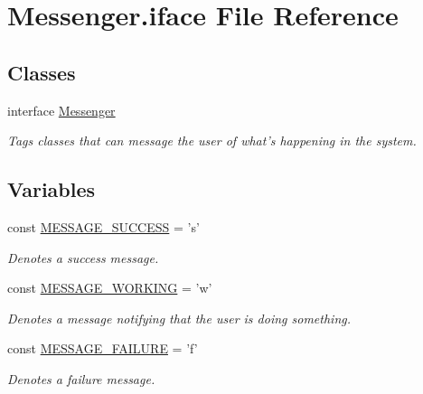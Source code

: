 \hypertarget{Messenger_8iface}{\section{Messenger.\-iface File Reference}
\label{Messenger_8iface}
}
\subsection*{Classes}
\begin{DoxyCompactItemize}
\item 
interface \hyperlink{interfaceMessenger}{Messenger}
\begin{DoxyCompactList}\small\item\em Tags classes that can message the user of what's happening in the system. \end{DoxyCompactList}\end{DoxyCompactItemize}
\subsection*{Variables}
\begin{DoxyCompactItemize}
\item 
const \hyperlink{Messenger_8iface_a380502784d2fa316c3e079af391c3b05}{M\-E\-S\-S\-A\-G\-E\-\_\-\-S\-U\-C\-C\-E\-S\-S} = 's'
\begin{DoxyCompactList}\small\item\em Denotes a success message. \end{DoxyCompactList}\item 
const \hyperlink{Messenger_8iface_a42a959808a10ab30584347844a7d1657}{M\-E\-S\-S\-A\-G\-E\-\_\-\-W\-O\-R\-K\-I\-N\-G} = 'w'
\begin{DoxyCompactList}\small\item\em Denotes a message notifying that the user is doing something. \end{DoxyCompactList}\item 
const \hyperlink{Messenger_8iface_a7ffc56b0d4599e10d5f0e9e65f992dc1}{M\-E\-S\-S\-A\-G\-E\-\_\-\-F\-A\-I\-L\-U\-R\-E} = 'f'
\begin{DoxyCompactList}\small\item\em Denotes a failure message. \end{DoxyCompactList}\end{DoxyCompactItemize}


